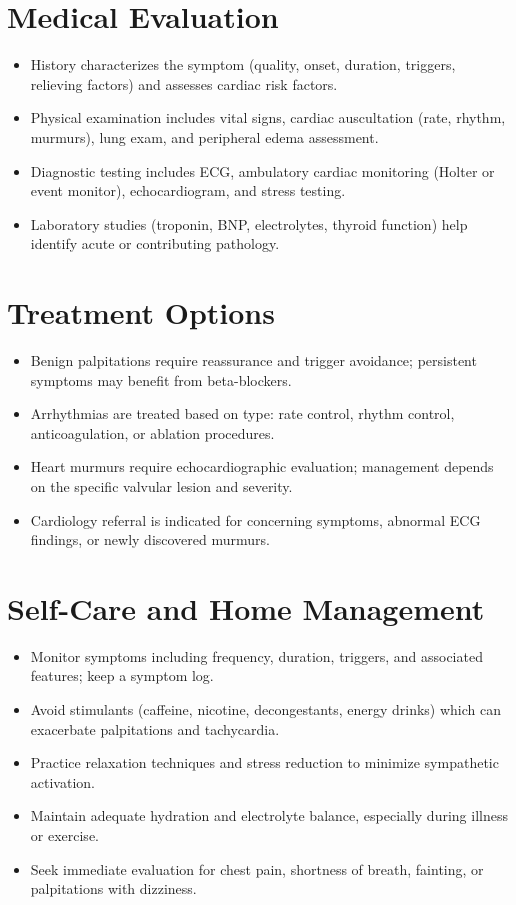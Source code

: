 \section*{Medical Evaluation}
\begin{itemize}
  \item History characterizes the symptom (quality, onset, duration, triggers, relieving factors) and assesses cardiac risk factors.
  \item Physical examination includes vital signs, cardiac auscultation (rate, rhythm, murmurs), lung exam, and peripheral edema assessment.
  \item Diagnostic testing includes ECG, ambulatory cardiac monitoring (Holter or event monitor), echocardiogram, and stress testing.
  \item Laboratory studies (troponin, BNP, electrolytes, thyroid function) help identify acute or contributing pathology.
\end{itemize}

\section*{Treatment Options}
\begin{itemize}
  \item Benign palpitations require reassurance and trigger avoidance; persistent symptoms may benefit from beta-blockers.
  \item Arrhythmias are treated based on type: rate control, rhythm control, anticoagulation, or ablation procedures.
  \item Heart murmurs require echocardiographic evaluation; management depends on the specific valvular lesion and severity.
  \item Cardiology referral is indicated for concerning symptoms, abnormal ECG findings, or newly discovered murmurs.
\end{itemize}

\section*{Self-Care and Home Management}
\begin{itemize}
  \item Monitor symptoms including frequency, duration, triggers, and associated features; keep a symptom log.
  \item Avoid stimulants (caffeine, nicotine, decongestants, energy drinks) which can exacerbate palpitations and tachycardia.
  \item Practice relaxation techniques and stress reduction to minimize sympathetic activation.
  \item Maintain adequate hydration and electrolyte balance, especially during illness or exercise.
  \item Seek immediate evaluation for chest pain, shortness of breath, fainting, or palpitations with dizziness.
\end{itemize}

